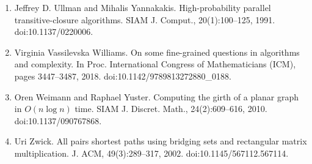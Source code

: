 \documentclass[10pt,a4paper]{article}
\begin{document}
\begin{enumerate}
\item[]  [44]  Jeffrey D. Ullman and Mihalis Yannakakis.  High-probability parallel transitive-closure algorithms.  SIAM J. Comput., 20(1):100–125, 1991.  doi:10.1137/0220006.  
\item[]  [45]  Virginia Vassilevska Williams.  On some fine-grained questions in algorithms and complexity.  In Proc. International Congress of Mathematicians (ICM), pages 3447–3487, 2018.  doi:10.1142/9789813272880\_0188.  
\item[]  [46]  Oren Weimann and Raphael Yuster.  Computing the girth of a planar graph in ${O}(n\log n)$ time.  SIAM J. Discret. Math., 24(2):609–616, 2010.  doi:10.1137/090767868.  
\item[]  [47]  Uri Zwick.  All pairs shortest paths using bridging sets and rectangular matrix multiplication.  J. ACM, 49(3):289–317, 2002.  doi:10.1145/567112.567114.  
\end{enumerate}
\end{document}
